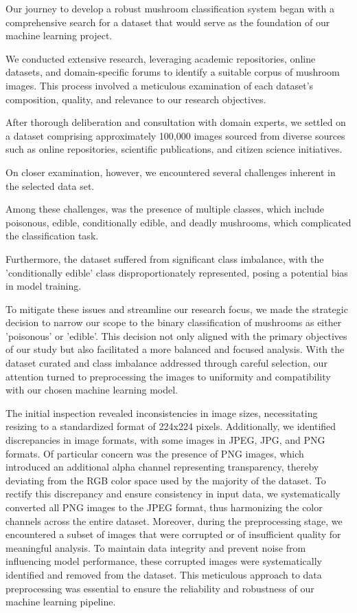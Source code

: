 Our journey to develop a robust mushroom classification system began with a comprehensive search for a dataset that would serve as the foundation of our machine learning project. 

We conducted extensive research, leveraging academic repositories, online datasets, and domain-specific forums to identify a suitable corpus of mushroom images. This process involved a meticulous examination of each dataset's composition, quality, and relevance to our research objectives. 

After thorough deliberation and consultation with domain experts, we settled on a dataset comprising approximately 100,000 images sourced from diverse sources such as online repositories, scientific publications, and citizen science initiatives. 


On closer examination, however, we encountered several challenges inherent in the selected data set.

Among these challenges, was the presence of multiple classes, which include poisonous, edible, conditionally edible, and deadly mushrooms, which complicated the classification task.

Furthermore, the dataset suffered from significant class imbalance, with the 'conditionally edible' class disproportionately represented, posing a potential bias in model training.

To mitigate these issues and streamline our research focus, we made the strategic decision to narrow our scope to the binary classification of mushrooms as either 'poisonous' or 'edible'. This decision not only aligned with the primary objectives of our study but also facilitated a more balanced and focused analysis. With the dataset curated and class imbalance addressed through careful selection, our attention turned to preprocessing the images to uniformity and compatibility with our chosen machine learning model. 

The initial inspection revealed inconsistencies in image sizes, necessitating resizing to a standardized format of 224x224 pixels. Additionally, we identified discrepancies in image formats, with some images in JPEG, JPG, and PNG formats. Of particular concern was the presence of PNG images, which introduced an additional alpha channel representing transparency, thereby deviating from the RGB color space used by the majority of the dataset. To rectify this discrepancy and ensure consistency in input data, we systematically converted all PNG images to the JPEG format, thus harmonizing the color channels across the entire dataset. Moreover, during the preprocessing stage, we encountered a subset of images that were corrupted or of insufficient quality for meaningful analysis. To maintain data integrity and prevent noise from influencing model performance, these corrupted images were systematically identified and removed from the dataset. This meticulous approach to data preprocessing was essential to ensure the reliability and robustness of our machine learning pipeline.


